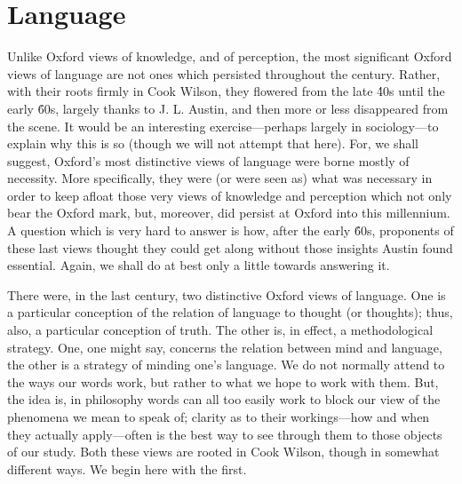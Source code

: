 \section{Language} %
\label{sec:language}

Unlike Oxford views of knowledge, and of perception, the most significant Oxford views of language are not ones which persisted throughout the century. Rather, with their roots firmly in Cook Wilson, they flowered from the late \'40s until the early \'60s, largely thanks to J. L. Austin, and then more or less disappeared from the scene. It would be an interesting exercise---perhaps largely in sociology---to explain why this is so (though we will not attempt that here). For, we shall suggest, Oxford’s most distinctive views of language were borne mostly of necessity. More specifically, they were (or were seen as) what was necessary in order to keep afloat those very views of knowledge and perception which not only bear the Oxford mark, but, moreover, did persist at Oxford into this millennium. A question which is very hard to answer is how, after the early \'60s, proponents of these last views thought they could get along without those insights Austin found essential. Again, we shall do at best only a little towards answering it.

There were, in the last century, two distinctive Oxford views of language. One is a particular conception of the relation of language to thought (or thoughts); thus, also, a particular conception of truth. The other is, in effect, a methodological strategy. One, one might say, concerns the relation between mind and language, the other is a strategy of minding one’s language. We do not normally attend to the ways our words work, but rather to what we hope to work with them. But, the idea is, in philosophy words can all too easily work to block our view of the phenomena we mean to speak of; clarity as to their workings—how and when they actually apply---often is the best way to see through them to those objects of our study. Both these views are rooted in Cook Wilson, though in somewhat different ways. We begin here with the first.

